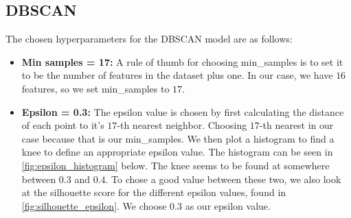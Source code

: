 \subsection{DBSCAN}

The chosen hyperparameters for the DBSCAN model are as follows:

\begin{itemize}
    \item \textbf{Min samples = 17:} A rule of thumb for choosing min\_samples is to set it to be the number of features in the dataset plus one. In our case, we have $16$ features, so we set min\_samples to $17$.
    \item \textbf{Epsilon = 0.3:} The epsilon value is chosen by first calculating the distance of each point to it's $17$-th nearest neighbor. Choosing $17$-th nearest in our case because that is our min\_samples. We then plot a histogram to find a knee to define an appropriate epsilon value. The histogram can be seen in \autoref{fig:epsilon_histogram} below. The knee seems to be found at somewhere between $0.3$ and $0.4$. To chose a good value between these two, we also look at the silhouette score for the different epsilon values, found in \autoref{fig:silhouette_epsilon}. We choose $0.3$ as our epsilon value.
\end{itemize}
\vspace{-0.4cm}
